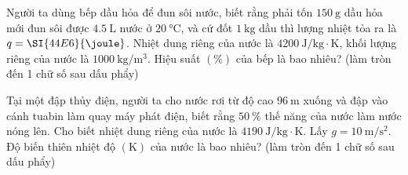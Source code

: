 \begin{ex}
	Người ta dùng bếp dầu hỏa để đun sôi nước, biết rằng phải tốn $\SI{150}{\gram}$ dầu hỏa mới đun sôi được $\SI{4.5}{\liter}$ nước ở $\SI{20}{\celsius}$, và cứ đốt $\SI{1}{\kilogram}$ dầu thì lượng nhiệt tỏa ra là $q=\SI{44E6}{\joule}$. Nhiệt dung riêng của nước là $\SI{4200}{\joule/\kilogram\cdot\kelvin}$, khối lượng riêng của nước là $\SI{1000}{\kilogram/\meter^3}$. Hiệu suất $\left(\si{\percent}\right)$ của bếp là bao nhiêu? (làm tròn đến 1 chữ số sau dấu phẩy)
\end{ex}
\begin{ex}
	Tại một đập thủy điện, người ta cho nước rơi từ độ cao $\SI{96}{\meter}$ xuống và đập vào cánh tuabin làm quay máy phát điện, biết rằng $\SI{50}{\percent}$ thế năng của nước làm nước nóng lên. Cho biết nhiệt dung riêng của nước là $\SI{4190}{\joule/\kilogram\cdot\kelvin}$. Lấy $g=\SI{10}{\meter/\second^2}$. Độ biến thiên nhiệt độ $\left(\si{\kelvin}\right)$ của nước là bao nhiêu? (làm tròn đến 1 chữ số sau dấu phẩy)
\end{ex}
